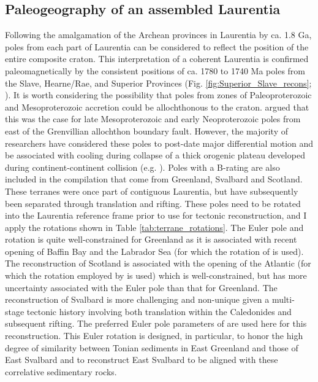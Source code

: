 \documentclass[twocolumn, switch]{article} %
\begin{document}
\subsection{Paleogeography of an assembled Laurentia}

Following the amalgamation of the Archean provinces in Laurentia by ca. 1.8 Ga, poles from each part of Laurentia can be considered to reflect the position of the entire composite craton. This interpretation of a coherent Laurentia is confirmed paleomagnetically by the consistent positions of ca. 1780 to 1740 Ma poles from the Slave, Hearne/Rae, and Superior Provinces (Fig. \ref{fig:Superior_Slave_recons}; \citealp{Swanson-Hysell2021b}). It is worth considering the possibility that poles from zones of Paleoproterozoic and Mesoproterozoic accretion could be allochthonous to the craton. \cite{Halls2015b} argued that this was the case for late Mesoproterozoic and early Neoproterozoic poles from east of the Grenvillian allochthon boundary fault. However, the majority of researchers have considered these poles to post-date major differential motion and be associated with cooling during collapse of a thick orogenic plateau developed during continent-continent collision (e.g. \citealp{Brown2012a}). Poles with a B-rating are also included in the compilation that come from Greenland, Svalbard and Scotland. These terranes were once part of contiguous Laurentia, but have subsequently been separated through translation and rifting. These poles need to be rotated into the Laurentia reference frame prior to use for tectonic reconstruction, and I apply the rotations shown in Table \ref{tab:terrane_rotations}. The Euler pole and rotation is quite well-constrained for Greenland as it is associated with recent opening of Baffin Bay and the Labrador Sea (for which the rotation of \citealp{Roest1989a} is used). The reconstruction of Scotland is associated with the opening of the Atlantic (for which the rotation employed by \citealp{Torsvik2017a} is used) which is well-constrained, but has more uncertainty associated with the Euler pole than that for Greenland. The reconstruction of Svalbard is more challenging and non-unique given a multi-stage tectonic history involving both translation within the Caledonides and subsequent rifting. The preferred Euler pole parameters of \cite{Maloof2006a} are used here for this reconstruction. This Euler rotation is designed, in particular, to honor the high degree of similarity between Tonian sediments in East Greenland and those of East Svalbard \citep{Maloof2006a, Hoffman2012a} and to reconstruct East Svalbard to be aligned with these correlative sedimentary rocks.
\end{document}
